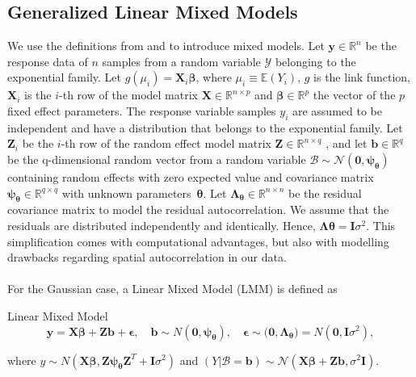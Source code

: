 \subsection{Generalized Linear Mixed Models}\label{sec:glmm}
We use the definitions from \citet{wood_generalized_2017} and \citet{bates_fitting_2015} to introduce mixed models. Let $\bm{y} \in \mathbb{R}^n$ be the response data of $n$ samples from a random variable $\mathcal{Y}$ belonging to the exponential family. Let $g(\mu_i)=\mathbf{X}_i \bm{\beta}$, where $\mu_i \equiv \mathbb{E}(Y_i)$, $g$ is the link function, $\mathbf{X}_i$ is the $i$-th row of the model matrix $\mathbf{X} \in \mathbb{R}^{n \times p}$ and $\bm{\beta} \in \mathbb{R}^p$ the vector of the  $p$ fixed effect parameters. The response variable samples $y_i$ are assumed to be independent and have a distribution that belongs to the exponential family. Let $\mathbf{Z}_i$ be the $i$-th row of the random effect model matrix $\mathbf{Z} \in \mathbb{R}^{n \times q}$ , and let $\bm{b} \in \mathbb{R}^{q}$ be the q-dimensional random vector from a random variable $\mathcal{B}\sim \mathcal N(\bm{0},\bm{\psi_{\theta}})$ containing random effects with zero expected value and covariance matrix $\bm{\psi_{\theta}} \in \mathbb{R}^{q \times q}$ with unknown parameters~$\bm{\theta}$. Let $\mathbf{\Lambda_{\theta}} \in \mathbb{R}^{n \times n}$ be the residual covariance matrix to model the residual autocorrelation. We assume that the residuals are distributed independently and identically. Hence, $\bm{\Lambda{\theta}} = \mathbf{I}\sigma^2$. This simplification comes with computational advantages, but also with modelling drawbacks regarding spatial autocorrelation in our data.
\\
\\
For the Gaussian case, a Linear Mixed Model (LMM) is defined as
\begin{defi}Linear Mixed Model
    \begin{equation}\label{eq:lmm}
    \mathbf{y} = \mathbf{X}\bm{\beta} + \mathbf{Z}\bm{b} + \bm{\epsilon}, \quad \bm{b}\sim N(\bm{0}, \bm{\psi_{\theta}}), \quad \bm{\epsilon} \sim \mathcal(\bm{0}, \bm{\Lambda_{\theta}}) = N(\bm{0},\mathbf{I}\sigma^2), 
    \end{equation}
\end{defi}
where $y\sim N(\mathbf{X}\bm{\beta}, \mathbf{Z}\bm{\psi_\theta}\mathbf{Z}^T + \mathbf{I}\sigma^2)$ and $(Y | \mathcal{B} = \bm{b}) \sim \mathcal{N}(\mathbf{X}\bm{\beta} + \mathbf{Z}\bm{b}, \sigma^2 \bm{I})$.
\\
\\
